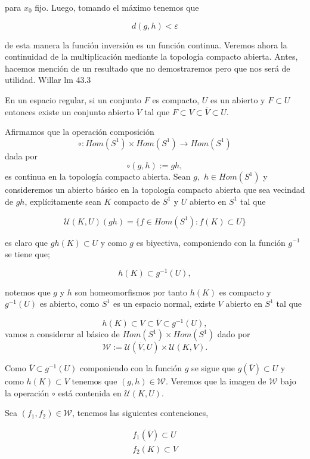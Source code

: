 para $x_0$ fijo. Luego, tomando el máximo tenemos que 

$$d(g,h) < \varepsilon$$

de esta manera la función inversión es un  función continua. Veremos ahora la continuidad de la multiplicación mediante la topología compacto abierta. Antes, hacemos mención de un resultado que no demostraremos pero que nos será de utilidad. Willar lm 43.3

\begin{lm}
En un espacio regular, si un conjunto $F$ es compacto, $U$ es un abierto y $F \subset U$ entonces existe un conjunto abierto $V$ tal que $F \subset V \subset \overline{V} \subset U.$
\end{lm}

Afirmamos que la operación composición 
$$\circ:Hom(S^1) \times Hom(S^1) \to Hom(S^1)$$ dada por 
$$\circ(g,h):=gh,$$
es continua en la topología compacto abierta. Sean $g,$ $h \in Hom(S^1)$ y consideremos un abierto básico en la topología compacto abierta que sea vecindad de $gh$, explícitamente sean $K$ compacto de $S^1$ y $U$ abierto en $S^1$ tal que

$$\mathcal{U}(K,U)(gh)=\{f \in Hom(S^1): f(K) \subset U\}$$

es claro que $gh(K) \subset U$ y como $g$ es biyectiva,  componiendo con la función $g^{-1}$ se tiene que; 

$$h(K) \subset g^{-1}(U),$$

notemos que $g$ y $h$ son homeomorfismos por tanto $h(K)$ es compacto y $g^{-1}(U)$ es abierto, como $S^1$ es un espacio normal, existe $V$ abierto en $S^1$ tal que 

$$h(K) \subset V \subset \overline{V} \subset g^{-1}(U),$$
vamos a considerar al básico de   $Hom(S^1) \times Hom(S^1)$ dado por  
$$\mathcal{W}:=\mathcal{U}(\overline{V},U) \times \mathcal{U}(K,V).$$

Como $\overline{V} \subset g^{-1}(U)$ componiendo con la función $g$ se sigue que $g(\overline{V}) \subset U$ y como $h(K) \subset V$ tenemos que $(g,h) \in \mathcal{W}$. Veremos que la imagen de $\mathcal{W}$ bajo la operación $\circ$ está contenida en $\mathcal{U}(K,U)$.


Sea $(f_1,f_2) \in \mathcal{W}$, tenemos las siguientes contenciones,  

\begin{align*}
f_1(\overline{V})\subset U \\
f_2(K)\subset V 
\end{align*}

